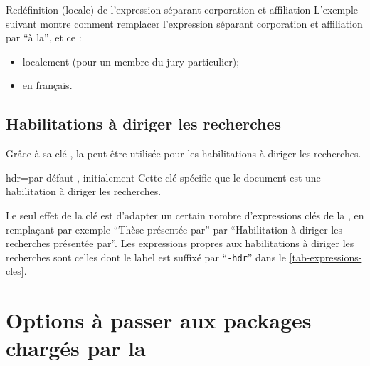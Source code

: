 \begin{dbexample}{Redéfinition (locale) de l'expression séparant corporation et
    affiliation}{}
  L'exemple suivant montre comment remplacer l'expression séparant corporation et
  affiliation par \enquote{\textvisiblespace{}à la\textvisiblespace{}}, et ce :
  \begin{itemize}
  \item localement (pour un membre du jury particulier);
  \item en français.
  \end{itemize}
\begin{bodycode}[listing options={showspaces}]
\end{bodycode}
\end{dbexample}

\subsection{Habilitations à diriger les recherches}
\label{sec-hdr}%
%

Grâce à sa clé , la \yatCl{} peut être utilisée pour
les habilitations à diriger les recherches.

\begin{docKey}{hdr}{=\textbar{}}{par défaut
    , initialement }
  Cette clé spécifie que le document est une habilitation à diriger les
  recherches.
\end{docKey}

Le seul effet de la clé  est d'adapter un certain nombre
d'expressions clés de la \yatCl{}, en remplaçant par exemple \enquote{Thèse
  présentée par} par \enquote{Habilitation à diriger les recherches présentée
  par}. Les expressions propres aux habilitations à diriger les recherches sont
celles dont le label est suffixé par \enquote{\texttt{-hdr}} dans le
\vref{tab-expressions-cles}.

\section{Options à passer aux packages chargés par la \yatCl}
\label{sec-options-passer-aux}%
%

